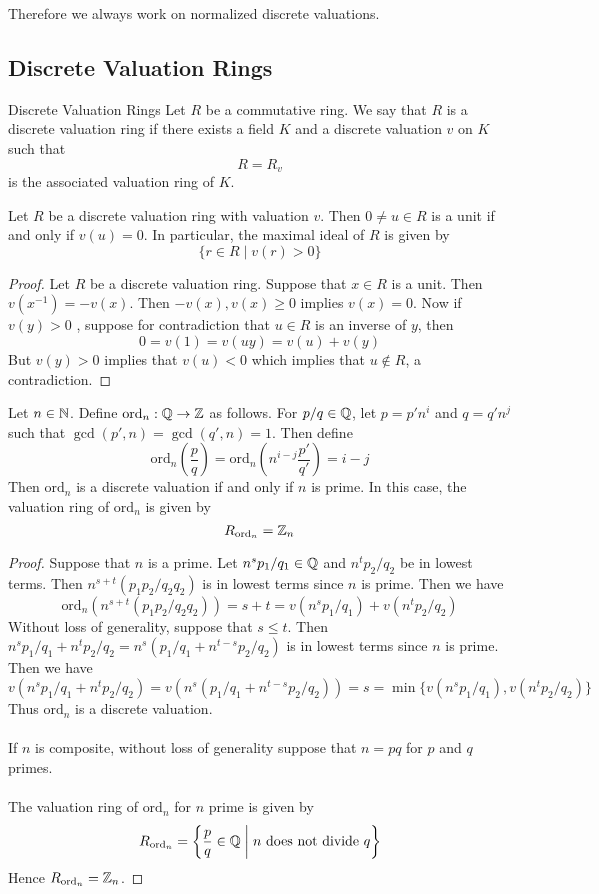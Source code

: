 \documentclass[a4paper]{article}
\begin{document}
Therefore we always work on normalized discrete valuations. 

\subsection{Discrete Valuation Rings}
\begin{defn}{Discrete Valuation Rings}{} Let $R$ be a commutative ring. We say that $R$ is a discrete valuation ring if there exists a field $K$ and a discrete valuation $v$ on $K$ such that $$R=R_v$$ is the associated valuation ring of $K$. 
\end{defn}

\begin{lmm}{}{} Let $R$ be a discrete valuation ring with valuation $v$. Then $0\neq u\in R$ is a unit if and only if $v(u)=0$. In particular, the maximal ideal of $R$ is given by $$\{r\in R\;|\;v(r)>0\}$$ 
\begin{proof}
Let $R$ be a discrete valuation ring. Suppose that $x\in R$ is a unit. Then $v(x^{-1})=-v(x)$. Then $-v(x),v(x)\geq 0$ implies $v(x)=0$. Now if $v(y)>0$ , suppose for contradiction that $u\in R$ is an inverse of $y$, then $$0=v(1)=v(uy)=v(u)+v(y)$$ But $v(y)>0$ implies that $v(u)<0$ which implies that $u\notin R$, a contradiction. 
\end{proof}
\end{lmm}

\begin{eg}{}{} Let $n\in\mathbb{N}$. Define $\text{ord}_n:\mathbb{Q}\to\mathbb{Z}$ as follows. For $p/q\in\mathbb{Q}$, let $p=p'n^i$ and $q=q'n^j$ such that $\gcd(p',n)=\gcd(q',n)=1$. Then define $$\text{ord}_n\left(\frac{p}{q}\right)=\text{ord}_n\left(n^{i-j}\frac{p'}{q'}\right)=i-j$$ Then $\text{ord}_n$ is a discrete valuation if and only if $n$ is prime. In this case, the valuation ring of $\text{ord}_n$ is given by $$R_{\text{ord}_n}=\mathbb{Z}_n$$ 
\begin{proof}
Suppose that $n$ is a prime. Let $n^sp_1/q_1\in\mathbb{Q}$ and $n^tp_2/q_2$ be in lowest terms. Then $n^{s+t}(p_1p_2/q_2q_2)$ is in lowest terms since $n$ is prime. Then we have $$\text{ord}_n(n^{s+t}(p_1p_2/q_2q_2))=s+t=v(n^sp_1/q_1)+v(n^tp_2/q_2)$$ Without loss of generality, suppose that $s\leq t$. Then $n^sp_1/q_1+n^tp_2/q_2=n^s(p_1/q_1+n^{t-s}p_2/q_2)$ is in lowest terms since $n$ is prime. Then we have $$v(n^sp_1/q_1+n^tp_2/q_2)=v(n^s(p_1/q_1+n^{t-s}p_2/q_2))=s=\min\{v(n^sp_1/q_1), v(n^tp_2/q_2)\}$$ Thus $\text{ord}_n$ is a discrete valuation. \\~\\

If $n$ is composite, without loss of generality suppose that $n=pq$ for $p$ and $q$ primes. \\~\\

The valuation ring of $\text{ord}_n$ for $n$ prime is given by $$R_{\text{ord}_n}=\left\{\frac{p}{q}\in\mathbb{Q}\;\bigg{|}\;n\text{ does not divide }q\right\}$$ Hence $R_{\text{ord}_n}=\mathbb{Z}_n$. 
\end{proof}
\end{eg}
\end{document}
